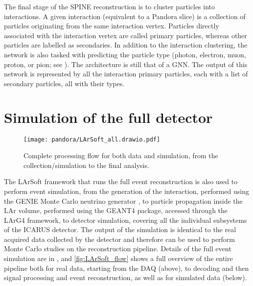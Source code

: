 The final stage of the SPINE reconstruction is to cluster particles into interactions. A given interaction (equivalent to a Pandora slice) is a collection of particles originating from the same interaction vertex. Particles directly associated with the interaction vertex are called primary particles, whereas other particles are labelled as secondaries. In addition to the interaction clustering, the network is also tasked with predicting the particle type (photon, electron, muon, proton, or pion; see \cite{DeepLearnPhysics:2020hut}). The architecture is still that of a GNN. The output of this network is represented by all the interaction primary particles, each with a list of secondary particles, all with their types. 

\section{Simulation of the full detector}

\begin{figure}
    \centering
    \texttt{[image: pandora/LArSoft\_all.drawio.pdf]}
    \caption[LArSoft complete overview]{Complete processing flow for both data and simulation, from the collection/simulation to the final analysis. }
    \label{fig:LArSoft_flow}
\end{figure}

The LArSoft framework that runs the full event reconstruction is also used to perform event simulation, from the generation of the interaction, performed using the GENIE Monte Carlo neutrino generator \cite{Andreopoulos:2015wxa}, to  particle propagation inside the LAr volume, performed using the GEANT4 package, accessed through the LArG4 framework, to detector simulation, covering all the individual subsystems of the ICARUS detector. The output of the simulation is identical to the real acquired data collected by the detector and therefore can be used to perform Monte Carlo studies on the reconstruction pipeline. Details of the full event simulation are in \cite{arteroponsStudyReconstructionNuMuCC}, and \autoref{fig:LArSoft_flow} shows a full overview of the entire pipeline both for real data, starting from the DAQ (above), to decoding and then signal processing and event reconstruction, as well as for simulated data (below).